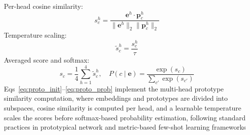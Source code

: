 \documentclass[10pt,letterpaper]{article}
\begin{document}
                                                                                                                 Per-head cosine similarity:
                                                                                                                 \begin{equation}
                                                                                                                 s_c^h = \frac{\mathbf{e}^h \cdot \mathbf{p}_c^h}{\|\mathbf{e}^h\|_2\|\mathbf{p}_c^h\|_2}
                                                                                                                 \end{equation}
                                                                                                                 Temperature scaling:
                                                                                                                 \begin{equation}
                                                                                                                 \tilde{s}_c^h = \frac{s_c^h}{\tau}
                                                                                                                 \end{equation}
                                                                                                                 Averaged score and softmax:
                                                                                                                 \begin{equation}
                                                                                                                 \label{eq:proto_prob}
                                                                                                                 s_c = \frac{1}{4}\sum_{h=1}^{4}\tilde{s}_c^h,\quad
                                                                                                                 P(c \mid \mathbf{e}) = \frac{\exp(s_c)}{\sum_{c'}\exp(s_{c'})}
                                                                                                                 \end{equation}
                                                                                                                 Eqs~\ref{eq:proto_init}--\ref{eq:proto_prob} implement the multi-head prototype similarity computation, where embeddings and prototypes are divided into subspaces, cosine similarity is computed per head, and a learnable temperature scales the scores before softmax-based probability estimation, following standard practices in prototypical network and metric-based few-shot learning frameworks~\cite{ref52}
                                                                                                                  
\end{document}
